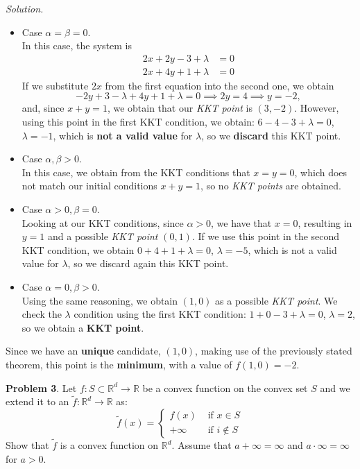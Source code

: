 \documentclass[a4paper]{article}
\newenvironment{problem}[2][Problem]
    { \begin{mdframed}[backgroundcolor=gray!20] \vspace*{0.1cm} \textbf{#1 #2}.}
    {  \end{mdframed}\vspace{0.3cm}}
\newenvironment{solution}
    {\textit{Solution.}\\}
    {}
\newcommand{\R}{\mathbb R}
\begin{document}
\begin{solution}
  \begin{itemize}
    \item Case \(\alpha = \beta = 0\).\\
          In this case, the system is
          \begin{align*}
            2x + 2y - 3 + \lambda & = 0 \\
            2x + 4y +1 + \lambda  & = 0
          \end{align*}
          If we substitute \(2x\) from the first equation into the second one, we obtain
          \[
            -2y +3 - \lambda +4y + 1 + \lambda = 0 \implies 2y = 4  \implies y = -2,
          \]
          and, since \(x+y = 1\), we obtain that our \emph{KKT point} is \((3,-2)\). However, using this point in the first KKT condition, we obtain: \(6 -  4 - 3 + \lambda = 0\), \(\lambda = -1\), which is \textbf{not a valid value} for \(\lambda\), so we \textbf{discard} this KKT point.
    \item Case \(\alpha, \beta > 0\).\\
          In this case, we obtain from the KKT conditions that \(x=  y = 0\), which does not match our initial conditions \(x+y = 1\), so no \emph{KKT points} are obtained.
    \item Case \(\alpha > 0, \beta = 0\).\\
          Looking at our KKT conditions, since \(\alpha > 0\), we have that \(x = 0\), resulting in \(y=1\) and a possible \emph{KKT point} \((0,1)\). If we use this point in the second KKT condition, we obtain \(0+4+1 + \lambda = 0\), \(\lambda = -5\), which is not a valid value for \(\lambda\), so we discard again this KKT point.
    \item Case \(\alpha = 0, \beta > 0\).\\
          Using the same reasoning, we obtain \((1,0)\) as a possible \emph{KKT point}. We check the \(\lambda\) condition using the first KKT condition: \(1 + 0 -3 + \lambda = 0\), \(\lambda = 2\), so we obtain a \textbf{KKT point}.
  \end{itemize}

  Since we have an \textbf{unique} candidate, \((1,0)\), making use of the previously stated theorem, this point is the \textbf{minimum}, with a value of \(f(1,0) = -2\).

\end{solution}

\begin{problem}{3}
Let \(f: S \subset \R^d \to \R\) be a convex function on the convex set \(S\) and we extend it to an \(\tilde f : \R^d \to \R\) as:
\[
  \tilde f(x) = \begin{cases}
    f(x)    & \text{ if } x \in S    \\
    +\infty & \text{ if } i \notin S
  \end{cases}
\]
Show that \(\tilde f\) is a convex function on \(\R^d\). Assume that \(a+\infty = \infty\) and \(a\cdot \infty = \infty\) for \(a > 0\).
\end{problem}
\end{document}
